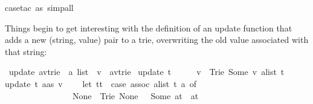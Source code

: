 \begin{isabellebody}
%
\isadelimproof
%
\endisadelimproof
%
\isatagproof
{}\isamarkupfalse%
{}case{}tac\ as{}\ simp{}all{}\isanewline
{}\isamarkupfalse%
%
\endisatagproof
{\isafoldproof}%
%
\isadelimproof
%
\endisadelimproof
%
\begin{isamarkuptext}%
Things begin to get interesting with the definition of an update function
that adds a new (string, value) pair to a trie, overwriting the old value
associated with that string:%
\end{isamarkuptext}%
\isamarkuptrue%
\isamarkupfalse%
\ update{}{}\ {}{}{}a{}{}v{}trie\ {}\ {}a\ list\ {}\ {}v\ {}\ {}{}a{}{}v{}trie{}\ \isanewline
{}update\ t\ {}{}\ \ \ \ \ v\ {}\ Trie\ {}Some\ v{}\ {}alist\ t{}{}\ {}\isanewline
{}update\ t\ {}a{}as{}\ v\ {}\isanewline
\ \ \ {}let\ tt\ {}\ {}case\ assoc\ {}alist\ t{}\ a\ of\isanewline
\ \ \ \ \ \ \ \ \ \ \ \ \ \ \ \ None\ {}\ Trie\ None\ {}{}\ {}\ Some\ at\ {}\ at{}\isanewline

\end{isabellebody}
